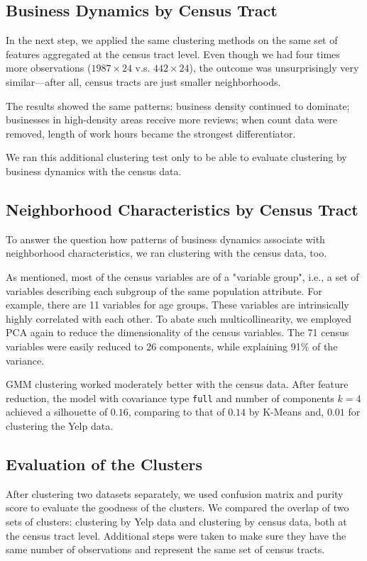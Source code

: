 \documentclass[compsoc]{IEEEtran}
\begin{document}
\subsection{Business Dynamics by Census Tract}

In the next step, we applied the same clustering methods on the same set of features aggregated at the census tract level. Even though we had four times more observations ($1987 \times 24$ v.s. $442 \times 24$), the outcome was unsurprisingly very similar---after all, census tracts are just smaller neighborhoods. 

The results showed the same patterns: business density continued to dominate; businesses in high-density areas receive more reviews; when count data were removed, length of work hours became the strongest differentiator.

We ran this additional clustering test only to be able to evaluate clustering by business dynamics with the census data.

\subsection{Neighborhood Characteristics by Census Tract}

To answer the question how patterns of business dynamics associate with neighborhood characteristics, we ran clustering with the census data, too.

As mentioned, most of the census variables are of a "variable group", i.e., a set of variables describing each subgroup of the same population attribute. For example, there are 11 variables for age groups. These variables are intrinsically highly correlated with each other. To abate such multicollinearity, we employed PCA again to reduce the dimensionality of the census variables. The 71 census variables were easily reduced to 26 components, while explaining 91\% of the variance.

GMM clustering worked moderately better with the census data. After feature reduction, the model with covariance type \texttt{full} and number of components $k = 4$ achieved a silhouette of $0.16$, comparing to that of $0.14$ by K-Means and, $0.01$ for clustering the Yelp data.

\subsection{Evaluation of the Clusters}

After clustering two datasets separately, we used confusion matrix and purity score to evaluate the goodness of the clusters. We compared the overlap of two sets of clusters: clustering by Yelp data and clustering by census data, both at the census tract level. Additional steps were taken to make sure they have the same number of observations and represent the same set of census tracts.
\end{document}
